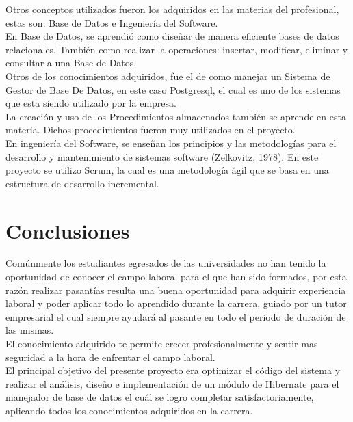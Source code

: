 \documentclass[12pt,oneside]{book}
\begin{document}
	Otros conceptos utilizados fueron los adquiridos en las materias del profesional, estas son: Base de Datos e Ingeniería del Software.\\
	
	En Base de Datos, se aprendió como diseñar de manera eficiente bases de datos relacionales. También como realizar la operaciones: insertar, modificar, eliminar y consultar a una Base de Datos.\\
	
	Otros de los conocimientos adquiridos, fue el de como manejar un Sistema de Gestor de Base De Datos, en este caso Postgresql, el cual es uno de los sistemas que esta siendo utilizado por la empresa.\\
	
	La creación y uso de los Procedimientos almacenados también se aprende en esta materia. Dichos procedimientos fueron muy utilizados en el proyecto.\\
	
	En ingeniería del Software, se enseñan los principios y las metodologías para el desarrollo y mantenimiento de sistemas software (Zelkovitz, 1978). En este proyecto se utilizo Scrum, la cual es una metodología ágil que se basa en una estructura de desarrollo incremental.
	
	\chapter*{Conclusiones} 
	
	Comúnmente los estudiantes egresados de las universidades no han tenido la oportunidad de conocer el campo laboral para el que han sido formados, por esta razón realizar pasantías resulta una buena oportunidad para adquirir experiencia laboral y poder aplicar todo lo aprendido durante la carrera, guiado por un tutor empresarial el cual siempre ayudará al pasante en todo el periodo de duración de las mismas.\\
	
	El conocimiento adquirido te permite crecer profesionalmente y sentir mas seguridad a la hora de enfrentar el campo laboral. \\
	
	El principal objetivo del presente proyecto era optimizar el código del sistema y realizar el análisis, diseño e implementación de un módulo de Hibernate para el manejador de base de datos el cuál se logro completar satisfactoriamente, aplicando todos los conocimientos adquiridos en la carrera.\\
	
\end{document}
